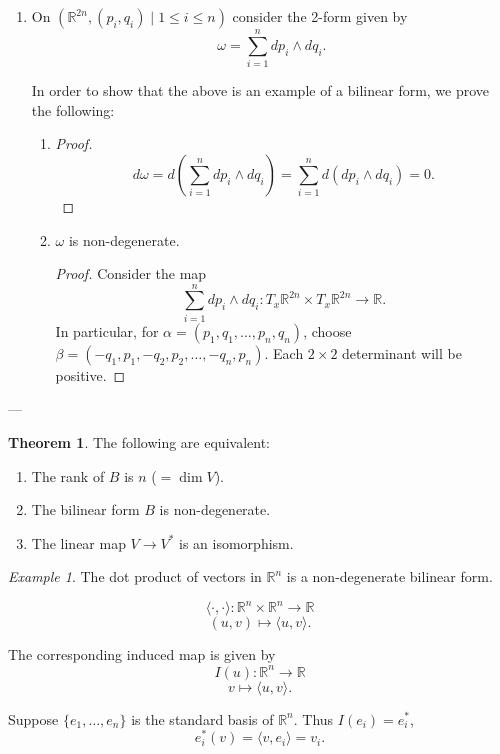 \documentclass[11pt]{article}
\theoremstyle{definition}
\newtheorem{theorem}{Theorem}[section]
\theoremstyle{remark}
\newtheorem{example}{Example}[section]
\begin{document}
\begin{enumerate}

\item On $(\mathbb{R}^{2n}, (p_i, q_i) \mid 1 \leq i \leq n)$ consider the 2-form given by
\[
\omega = \sum_{i=1}^n dp_i \wedge dq_i.
\]

In order to show that the above is an example of a bilinear form, we prove the following:

\begin{enumerate}

\item
\begin{proof}
\[
d\omega = d\left(\sum_{i=1}^n dp_i \wedge dq_i\right) = \sum_{i=1}^n d(dp_i \wedge dq_i) = 0.
\]
\end{proof}

\item $\omega$ is non-degenerate.

\begin{proof}
Consider the map
\[
\sum_{i=1}^n dp_i \wedge dq_i : T_x \mathbb{R}^{2n} \times T_x \mathbb{R}^{2n} \to \mathbb{R}.
\]
In particular, for $\alpha = (p_1, q_1, \dots, p_n, q_n)$,
choose $\beta = (-q_1, p_1, -q_2, p_2, \dots, -q_n, p_n)$.
Each $2 \times 2$ determinant will be positive.
\end{proof}

\end{enumerate}

\end{enumerate}

---

\begin{theorem}\label{thm:tfae}
The following are equivalent:

\begin{enumerate}
    \item The rank of $B$ is $n$ ($= \dim V$).
    \item The bilinear form $B$ is non-degenerate.
    \item The linear map $V \to V^*$ is an isomorphism.
\end{enumerate}
\end{theorem}

\begin{example}\label{ex:dot_product}
The dot product of vectors in $\mathbb{R}^n$ is a non-degenerate bilinear form.

\[
\langle \cdot, \cdot \rangle : \mathbb{R}^n \times \mathbb{R}^n \to \mathbb{R}
\]
\[
(u, v) \mapsto \langle u, v \rangle.
\]

The corresponding induced map is given by
\[
I(u) : \mathbb{R}^n \to \mathbb{R}
\]
\[
v \mapsto \langle u, v \rangle.
\]

Suppose $\{e_1, \dots, e_n\}$ is the standard basis of $\mathbb{R}^n$. Thus $I(e_i) = e_i^*$,
\[
e_i^*(v) = \langle v, e_i \rangle = v_i.
\]
\end{example}
\end{document}
